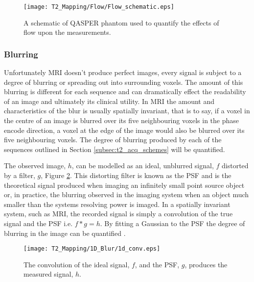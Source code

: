 \begin{figure}[H]
	\centering
	\texttt{[image: T2\_Mapping/Flow/Flow\_schematic.eps]}
	\caption{A schematic of \ac{QASPER} phantom used to quantify the effects of flow upon the \ttwo measurements.}
	\label{fig:t2_flow_phantom_schematic}	
\end{figure}

\subsubsection{Blurring}
Unfortunately \ac{MRI} doesn't produce perfect images, every signal is subject to a degree of blurring or spreading out into surrounding voxels. The amount of this blurring is different for each sequence and can dramatically effect the readability of an image and ultimately its clinical utility. In \ac{MRI} the amount and characteristics of the blur is usually spatially invariant, that is to say, if a voxel in the centre of an image is blurred over its five neighbouring voxels in the phase encode direction, a voxel at the edge of the image would also be blurred over its five neighbouring voxels. The degree of blurring produced by each of the sequences outlined in Section \ref{subsec:t2_acq_schemes} will be quantified.

The observed image, $h$, can be modelled as an ideal, unblurred signal, $f$ distorted by a filter, $g$, Figure \ref{fig:t2_1d_blur}. This distorting filter is known as the \ac{PSF} and is the theoretical signal produced when imaging an infinitely small point source object or, in practice, the blurring observed in the imaging system when an object much smaller than the systems resolving power is imaged. In a spatially invariant system, such as \ac{MRI}, the recorded signal is simply a convolution of the true signal and the \ac{PSF} i.e. $f \ast g = h$. By fitting a Gaussian to the \ac{PSF} the degree of blurring in the image can be quantified \cite{chaimow_more_2017, chaimow_more_2017-1}. 
\begin{figure}[H]
	\centering
	\texttt{[image: T2\_Mapping/1D\_Blur/1d\_conv.eps]}
	\caption{The convolution of the ideal signal, $f$, and the \ac{PSF}, $g$, produces the measured signal, $h$.}
	\label{fig:t2_1d_blur}	
\end{figure}

